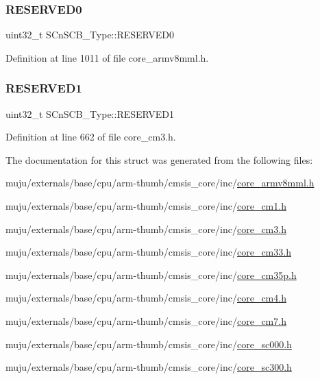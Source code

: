 \subsubsection{\texorpdfstring{R\+E\+S\+E\+R\+V\+E\+D0}{RESERVED0}}
{\footnotesize\ttfamily uint32\+\_\+t S\+Cn\+S\+C\+B\+\_\+\+Type\+::\+R\+E\+S\+E\+R\+V\+E\+D0}



Definition at line 1011 of file core\+\_\+armv8mml.\+h.

\mbox{\label{struct_s_cn_s_c_b___type_a0bce3f86e9f6e00085cf5a126ae201c6}} 
\subsubsection{\texorpdfstring{R\+E\+S\+E\+R\+V\+E\+D1}{RESERVED1}}
{\footnotesize\ttfamily uint32\+\_\+t S\+Cn\+S\+C\+B\+\_\+\+Type\+::\+R\+E\+S\+E\+R\+V\+E\+D1}



Definition at line 662 of file core\+\_\+cm3.\+h.



The documentation for this struct was generated from the following files\+:\begin{DoxyCompactItemize}
\item 
muju/externals/base/cpu/arm-\/thumb/cmsis\+\_\+core/inc/\hyperlink{core__armv8mml_8h}{core\+\_\+armv8mml.\+h}\item 
muju/externals/base/cpu/arm-\/thumb/cmsis\+\_\+core/inc/\hyperlink{core__cm1_8h}{core\+\_\+cm1.\+h}\item 
muju/externals/base/cpu/arm-\/thumb/cmsis\+\_\+core/inc/\hyperlink{core__cm3_8h}{core\+\_\+cm3.\+h}\item 
muju/externals/base/cpu/arm-\/thumb/cmsis\+\_\+core/inc/\hyperlink{core__cm33_8h}{core\+\_\+cm33.\+h}\item 
muju/externals/base/cpu/arm-\/thumb/cmsis\+\_\+core/inc/\hyperlink{core__cm35p_8h}{core\+\_\+cm35p.\+h}\item 
muju/externals/base/cpu/arm-\/thumb/cmsis\+\_\+core/inc/\hyperlink{core__cm4_8h}{core\+\_\+cm4.\+h}\item 
muju/externals/base/cpu/arm-\/thumb/cmsis\+\_\+core/inc/\hyperlink{core__cm7_8h}{core\+\_\+cm7.\+h}\item 
muju/externals/base/cpu/arm-\/thumb/cmsis\+\_\+core/inc/\hyperlink{core__sc000_8h}{core\+\_\+sc000.\+h}\item 
muju/externals/base/cpu/arm-\/thumb/cmsis\+\_\+core/inc/\hyperlink{core__sc300_8h}{core\+\_\+sc300.\+h}\end{DoxyCompactItemize}
